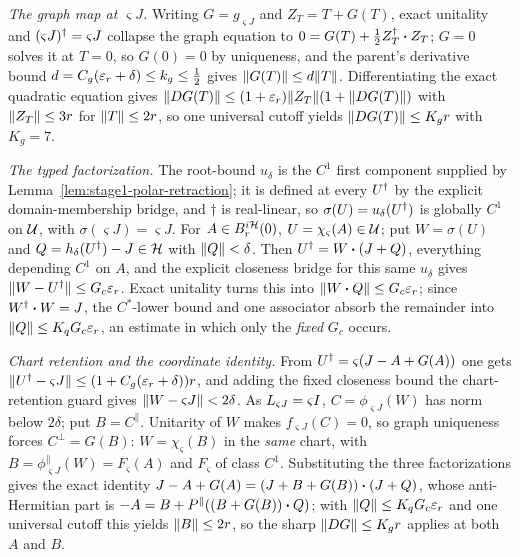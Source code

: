 \emph{The graph map at $\varsigma J$.} Writing $G=g_{\varsigma J}$ and $Z_T=T+G(T)$, exact
unitality and $(\varsigma J)^{\dagger}=\varsigma J$ collapse the graph equation to
$0=G(T)+\tfrac12Z_T^{\dagger}\mathbin{\bm{\cdot}} Z_T$; $G=0$ solves it at $T=0$, so $G(0)=0$ by uniqueness, and
the parent's derivative bound $d=C_g(\varepsilon_r+\delta)\le k_g\le\tfrac12$ gives
$\lVert G(T)\rVert\le d\lVert T\rVert$. Differentiating the exact quadratic equation gives
$\lVert DG(T)\rVert\le(1+\varepsilon_r)\lVert Z_T\rVert(1+\lVert DG(T)\rVert)$ with $\lVert Z_T\rVert\le3r$ for
$\lVert T\rVert\le2r$, so one universal cutoff yields $\lVert DG(T)\rVert\le K_gr$ with $K_g=7$.

\emph{The typed factorization.} The root-bound $u_\delta$ is the $C^{1}$ first component
supplied by Lemma~\ref{lem:stage1-polar-retraction}; it is defined at every $U^{\dagger}$ by the
explicit domain-membership bridge, and $\dagger$ is real-linear, so
$\sigma(U)=u_\delta(U^{\dagger})$ is globally $C^{1}$ on $\mathcal U$, with $\sigma(\varsigma J)=\varsigma J$.
For $A\in B^{i\mathcal H}_{r}(0)$, $U=\chi_{\varsigma}(A)\in\mathcal U$; put $W=\sigma(U)$ and
$Q=h_\delta(U^{\dagger})-J\in\mathcal H$ with $\lVert Q\rVert<\delta$. Then $U^{\dagger}=W\mathbin{\bm{\cdot}}(J+Q)$, everything
depending $C^{1}$ on $A$, and the explicit closeness bridge for this same $u_\delta$ gives
$\lVert W-U^{\dagger}\rVert\le G_c\varepsilon_r$. Exact unitality turns this into $\lVert W\mathbin{\bm{\cdot}} Q\rVert\le G_c\varepsilon_r$;
since $W^{\dagger}\mathbin{\bm{\cdot}} W=J$, the $C^*$-lower bound and one associator absorb the remainder into
$\lVert Q\rVert\le K_qG_c\varepsilon_r$, an estimate in which only the \emph{fixed} $G_c$ occurs.

\emph{Chart retention and the coordinate identity.} From
$U^{\dagger}=\varsigma(J-A+G(A))$ one gets $\lVert U^{\dagger}-\varsigma J\rVert\le(1+C_g(\varepsilon_r+\delta))r$, and
adding the fixed closeness bound the chart-retention guard gives $\lVert W-\varsigma J\rVert<2\delta$.
As $L_{\varsigma J}=\varsigma I$, $C=\phi_{\varsigma J}(W)$ has norm below $2\delta$; put
$B=C^{\parallel}$. Unitarity of $W$ makes $f_{\varsigma J}(C)=0$, so graph uniqueness forces
$C^{\perp}=G(B)$: $W=\chi_{\varsigma}(B)$ in the \emph{same} chart, with
$B=\phi^{\parallel}_{\varsigma J}(W)=F_{\varsigma}(A)$ and $F_{\varsigma}$ of class $C^{1}$.
Substituting the three factorizations gives the exact identity
$J-A+G(A)=(J+B+G(B))\mathbin{\bm{\cdot}}(J+Q)$, whose anti-Hermitian part is
$-A=B+P^{\parallel}((B+G(B))\mathbin{\bm{\cdot}} Q)$; with $\lVert Q\rVert\le K_qG_c\varepsilon_r$ and one universal
cutoff this yields $\lVert B\rVert\le2r$, so the sharp $\lVert DG\rVert\le K_gr$ applies at both $A$ and $B$.

